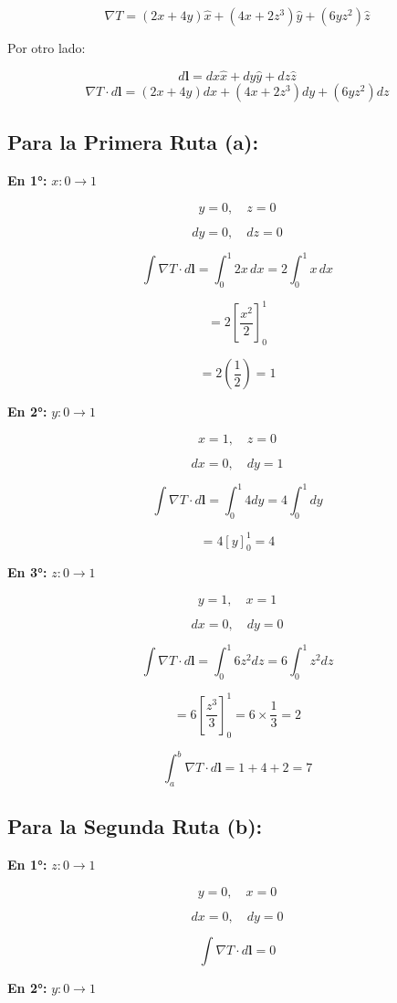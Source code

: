 \documentclass{article}
\begin{document}
\[
\nabla T = (2x + 4y) \hat{x} + (4x + 2z^3) \hat{y} + (6y z^2) \hat{z}
\]

Por otro lado:

\[
d\mathbf{l} = dx \hat{x} + dy \hat{y} + dz \hat{z}
\]
\[
\nabla T \cdot d\mathbf{l} = (2x + 4y)dx + (4x + 2z^3)dy + (6y z^2)dz
\]

\subsection*{Para la Primera Ruta (a):}

\textbf{En 1°:} \( x: 0 \to 1 \)

\[
y = 0, \quad z = 0
\]

\[
dy = 0, \quad dz = 0
\]

\[
\int \nabla T \cdot d\mathbf{l} = \int_0^1 2x \, dx = 2 \int_0^1 x \, dx
\]

\[
= 2 \left[ \frac{x^2}{2} \right]_0^1
\]

\[
= 2 \left( \frac{1}{2} \right) = 1
\]

\textbf{En 2°:} \( y: 0 \to 1 \)

\[
x = 1, \quad z = 0
\]

\[
dx = 0, \quad dy = 1
\]

\[
\int \nabla T \cdot d\mathbf{l} = \int_0^1 4 dy = 4 \int_0^1 dy
\]

\[
= 4 \left[ y \right]_0^1 = 4
\]

\textbf{En 3°:} \( z: 0 \to 1 \)

\[
y = 1, \quad x = 1
\]

\[
dx = 0, \quad dy = 0
\]

\[
\int \nabla T \cdot d\mathbf{l} = \int_0^1 6z^2 dz = 6 \int_0^1 z^2 dz
\]

\[
= 6 \left[ \frac{z^3}{3} \right]_0^1 = 6 \times \frac{1}{3} = 2
\]

\[
\int_a^b \nabla T \cdot d\mathbf{l} = 1 + 4 + 2 = \boxed{7}
\]


\subsection*{Para la Segunda Ruta (b):}

\textbf{En 1°:} \( z: 0 \to 1 \)

\[
y = 0, \quad x = 0
\]

\[
dx = 0, \quad dy = 0
\]

\[
\int \nabla T \cdot d\mathbf{l} = 0
\]

\textbf{En 2°:} \( y: 0 \to 1 \)
\end{document}
